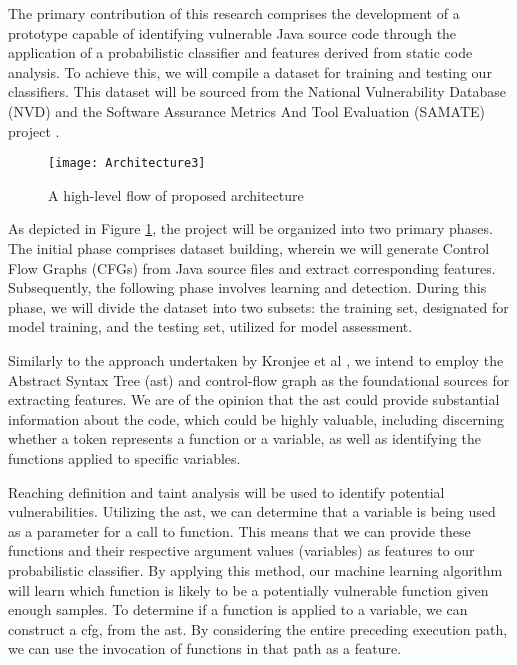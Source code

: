 The primary contribution of this research comprises the development of a prototype capable of identifying vulnerable Java source code through the application of a probabilistic classifier and features derived from static code analysis. To achieve this, we will compile a dataset for training and testing our classifiers. This dataset will be sourced from the National Vulnerability Database (NVD) \cite{NVD2023} and the Software Assurance Metrics And Tool Evaluation (SAMATE) project \cite{SAMATE2023}.

\begin{figure}[ht]
	\centering
	\texttt{[image: Architecture3]}
	  \caption{A high-level flow of proposed architecture}
  \label{fig:archquitecture}
\end{figure}

As depicted in Figure \ref{fig:archquitecture}, the project will be organized into two primary phases. The initial phase comprises dataset building, wherein we will generate Control Flow Graphs (CFGs) from Java source files and extract corresponding features. Subsequently, the following phase involves learning and detection. During this phase, we will divide the dataset into two subsets: the training set, designated for model training, and the testing set, utilized for model assessment.

Similarly to the approach undertaken by Kronjee et al \cite{Kronjee2018}, we intend to employ the Abstract Syntax Tree (\gls{ast}) and control-flow graph as the foundational sources for extracting features. We are of the opinion that the \gls{ast} could provide substantial information about the code, which could be highly valuable, including discerning whether a token represents a function or a variable, as well as identifying the functions applied to specific variables.

Reaching definition and taint analysis will be used to identify potential vulnerabilities. Utilizing the \gls{ast}, we can determine that a variable is being used as a parameter for a call to function. This means that we can provide these functions and their respective argument values (variables) as features to our probabilistic classifier. By applying this method, our machine learning algorithm will learn which function is likely to be a potentially vulnerable function given enough samples. To determine if a function is applied to a variable, we can construct a \gls{cfg}, from the \gls{ast}. By considering the entire preceding execution path, we can use the invocation of functions in that path as a feature.

